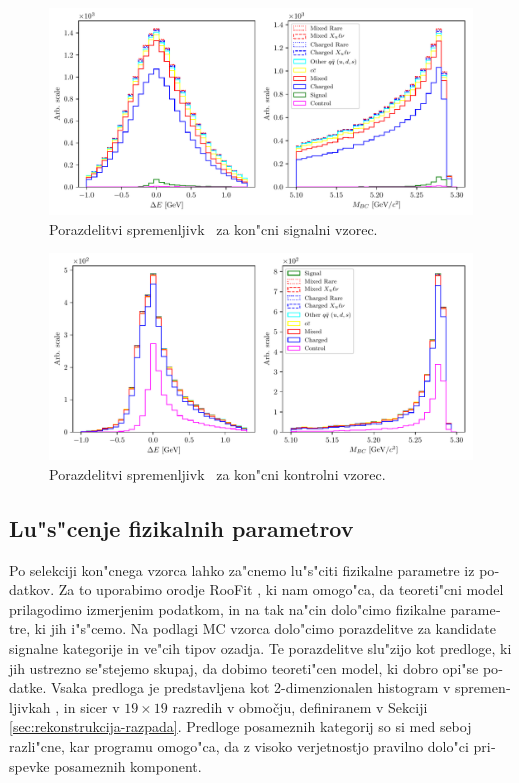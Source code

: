 \begin{otherlanguage}{slovene}
\begin{figure}[H]
	\centering
	\captionsetup{width=0.8\linewidth}
	\includegraphics[width=\linewidth]{fig/opt_uBB_si}
	\caption{Porazdelitvi spremenljivk \varss~za kon"cni signalni vzorec.}
	\label{fig:opt_uBB_si}
\end{figure}

\begin{figure}[H]
	\centering
	\captionsetup{width=0.8\linewidth}
	\includegraphics[width=\linewidth]{fig/onres_control_si}
	\caption{Porazdelitvi spremenljivk \varss~za kon"cni kontrolni vzorec.}
	\label{fig:onres_control_si}
\end{figure}

\subsection{Lu"s"cenje fizikalnih parametrov}

Po selekciji kon"cnega vzorca lahko za"cnemo lu"s"citi fizikalne parametre iz podatkov. Za to uporabimo orodje RooFit \cite{verkerke2006roofit}, ki nam omogo"ca, da teoreti"cni model prilagodimo izmerjenim podatkom, in na tak na"cin dolo"cimo fizikalne parametre, ki jih i"s"cemo. Na podlagi MC vzorca dolo"cimo porazdelitve za kandidate signalne kategorije in ve"cih tipov ozadja. Te porazdelitve slu"zijo kot predloge, ki jih ustrezno se"stejemo skupaj, da dobimo teoreti"cen model, ki dobro opi"se podatke. Vsaka predloga je predstavljena kot 2-dimenzionalen histogram v spremenljivkah \varss, in sicer v $19\times 19$ razredih v območju, definiranem v Sekciji \ref{sec:rekonstrukcija-razpada}. Predloge posameznih kategorij so si med seboj razli"cne, kar programu omogo"ca, da z visoko verjetnostjo pravilno dolo"ci prispevke posameznih komponent.


\end{otherlanguage}
